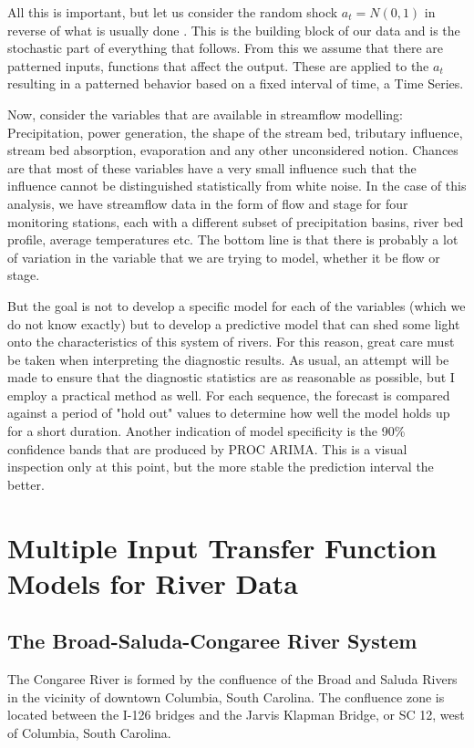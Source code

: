 \documentclass[12pt]{report}
\begin{document}
All this is important, but let us consider the random shock
$a_t=N(0,1)$ in reverse of what is usually done . This is the
building block of our data and is the stochastic part of
everything that follows. From this we assume that there are
patterned inputs, functions that affect the output. These are
applied to the $a_t$ resulting in a patterned behavior based on a
fixed interval of time, a Time Series.

Now, consider the variables that are available in streamflow
modelling:  Precipitation, power generation, the shape of the
stream bed, tributary influence, stream bed absorption,
evaporation and any other unconsidered notion. Chances are that
most of these variables have a very small influence such that the
influence cannot be distinguished statistically from white noise.
In the case of this analysis, we have streamflow data in the form
of flow and stage for four monitoring stations, each with a
different subset of precipitation basins, river bed profile,
average temperatures etc.  The bottom line is that there is
probably a lot of variation in the variable that we are trying to
model, whether it be flow or stage.

But the goal is not to develop a specific model for each of the
variables (which we do not know exactly) but to develop a
predictive model that can shed some light onto the characteristics
of this system of rivers.  For this reason, great care must be
taken when interpreting the diagnostic results. As usual, an
attempt will be made to ensure that the diagnostic statistics are
as reasonable as possible, but I employ a practical method as
well. For each sequence, the forecast is compared against a period
of "hold out" values to determine how well the model holds up for
a short duration. Another indication of model specificity is the
90\% confidence bands that are produced by PROC ARIMA. This is a
visual inspection only at this point, but the more stable the
prediction interval the better.

\chapter{Multiple Input Transfer Function Models for River Data}\label{chp:anal}

\section{The Broad-Saluda-Congaree River System}
The Congaree River is formed by the confluence of the Broad and
Saluda Rivers in the vicinity of downtown Columbia, South
Carolina. The confluence zone is located between the I-126 bridges
and the Jarvis Klapman Bridge, or SC 12, west of Columbia, South
Carolina.
\end{document}

